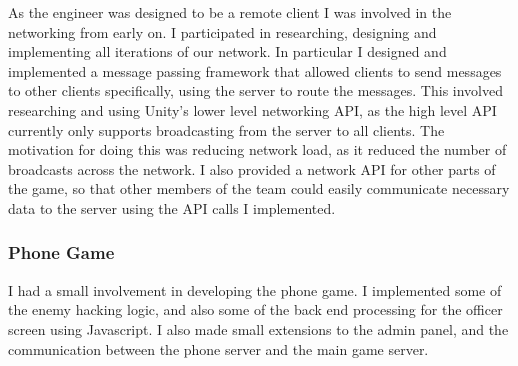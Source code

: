 \documentclass[a4paper,11pt]{article}
\begin{document}
As the engineer was designed to be a remote client I was involved in the networking from early on. I participated in researching, designing and implementing all iterations of our network. In particular I designed and implemented a message passing framework that allowed clients to send messages to other clients specifically, using the server to route the messages. This involved researching and using Unity’s lower level networking API, as the high level API currently only supports broadcasting from the server to all clients. The motivation for doing this was reducing network load, as it reduced the number of broadcasts across the network. I also provided a network API for other parts of the game, so that other members of the team could easily communicate necessary data to the server using the API calls I implemented.

\subsubsection{Phone Game}

I had a small involvement in developing the phone game. I implemented some of the enemy hacking logic, and also some of the back end processing for the officer screen using Javascript. I also made small extensions to the admin panel, and the communication between the phone server and the main game server.

\clearpage
\end{document}
